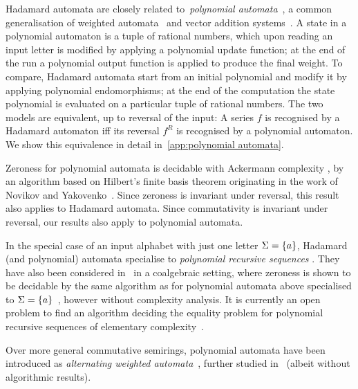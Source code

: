 \begin{remark}
    \label{rem:Hadamard and polynomial automata}
    Hadamard automata are closely related to~\emph{polynomial automata}~\cite{BenediktDuffSharadWorrell:PolyAut:LICS:2017},
    a common generalisation of weighted automata~\cite{Schutzenberger:IC:1961}
    and vector addition systems~\cite{Mayr:STOC:1981}.
    A state in a polynomial automaton is a tuple of rational numbers,
    which upon reading an input letter is modified by applying a polynomial update function;
    at the end of the run a polynomial output function is applied to produce the final weight.
    To compare, Hadamard automata start from an initial polynomial
    and modify it by applying polynomial endomorphisms;
    at the end of the computation the state polynomial is evaluated on a particular tuple of rational numbers.
    The two models are equivalent, up to reversal of the input:
    A series $f$ is recognised by a Hadamard automaton
    iff its reversal $f^R$ is recognised by a polynomial automaton.
    We show this equivalence in detail in~\cref{app:polynomial automata}.
    
    Zeroness for polynomial automata is decidable with Ackermann complexity
    \-\cite[Corollary 1]{BenediktDuffSharadWorrell:PolyAut:LICS:2017},
    by an algorithm based on Hilbert's finite basis theorem
    originating in the work of Novikov and Yakovenko~\cite{NovikovYakovenko:1999}.
    Since zeroness is invariant under reversal,
    this result also applies to Hadamard automata.
    Since commutativity is invariant under reversal,
    our results also apply to polynomial automata.

    In the special case of an input alphabet with just one letter $\Sigma = \left\{a\right\}$,
    Hadamard (and polynomial) automata specialise to \emph{polynomial recursive sequences}\-
    \cite{Cadilhac:Mazowiecki:Paperman:Pilipczuk:Senizergues:ToCS:2021}.
    They have also been considered in~\cite{BorealeGorla:CONCUR:2021} in a coalgebraic setting,
    where zeroness is shown to be decidable by the same algorithm as for polynomial automata above
    specialised to $\Sigma = \left\{a\right\}$~\cite[Theorem 4.1]{BorealeGorla:CONCUR:2021},
    however without complexity analysis.
    It is currently an open problem to find an algorithm deciding the equality problem for polynomial recursive sequences
    of elementary complexity~\cite{ClementeDontenBuryMazowieckiPilipczuk:STACS:23}.

    Over more general commutative semirings,
    polynomial automata have been introduced as
    \emph{alternating weighted automata}~\cite{KostolanyiMisun:TCS:2018},
    further studied in~\cite{Grabolle:EPTCS:2021}
    (albeit without algorithmic results).
\end{remark}

